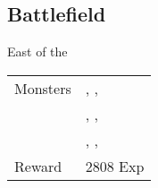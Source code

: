 \subsection{Battlefield}
\label{map:battlefield_19}

East of the 

\noindent\begin{tabularx}{\textwidth}[l]{lX}
	Monsters
	& \nameref{monster:skuldier}, \nameref{monster:skuldier}, \nameref{monster:water_hag} \\
	& \nameref{monster:skuldier}, \nameref{monster:skuldier}, \nameref{monster:skuldier} \\
	& \nameref{monster:ooze}, \nameref{monster:ooze}, \nameref{monster:ooze}
\\ \hline
	Reward & 2808 Exp
\end{tabularx}
